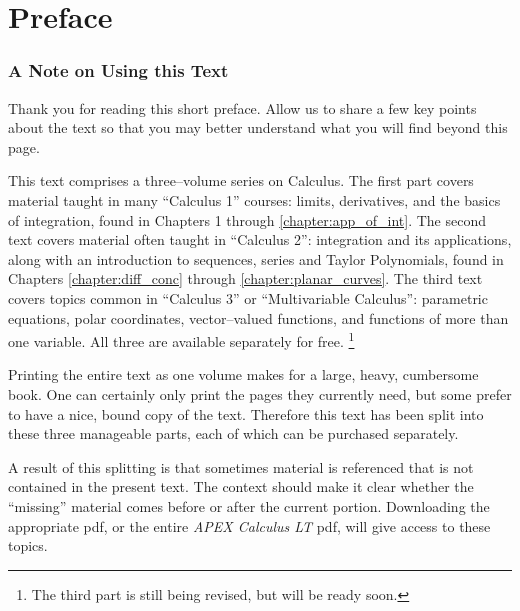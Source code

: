 \prefacegeometry
\chapter*{Preface}
\thispagestyle{empty}

\subsection*{A Note on Using this Text}

Thank you for reading this short preface. Allow us to share a few key points about the text so that you may better understand what you will find beyond this page.

This text comprises a three--volume series on Calculus.
The first part covers material taught in many ``Calculus 1'' courses: limits, derivatives, and the basics of integration, found in Chapters 1 through \ref{chapter:app_of_int}. The second text covers material often taught in ``Calculus 2'': integration and its applications, along with an introduction to sequences, series and Taylor Polynomials, found in Chapters \ref{chapter:diff_conc} through \ref{chapter:planar_curves}. The third text covers topics common in ``Calculus 3'' or ``Multivariable Calculus'': parametric equations, polar coordinates, vector--valued functions, and functions of more than one variable.
All three are available separately for free.%
\footnote{The third part is still being revised, but will be ready soon.}

Printing the entire text as one volume makes for a large, heavy, cumbersome book. One can certainly only print the pages they currently need, but some prefer to have a nice, bound copy of the text. Therefore this text has been split into these three manageable parts, each of which can be purchased separately.%

A result of this splitting is that sometimes material is referenced that is not contained in the present text. The context should make it clear whether the ``missing'' material comes before or after the current portion. Downloading the appropriate pdf, or the entire \textit{APEX Calculus LT} pdf, will give access to these topics.

